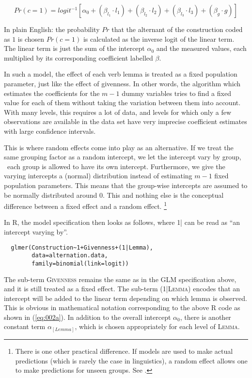 \begin{equation}
  Pr(c=1)=logit^{-1}\left[\alpha_0+(\beta_{l_1}\cdot l_1)+(\beta_{l_2}\cdot l_2)+(\beta_{l_3}\cdot l_3)+(\beta_{g}\cdot g)\right]
  \label{eq:001a}
\end{equation}

In plain English: the probability $Pr$ that the alternant of the construction coded as $1$ is chosen $Pr(c=1)$ is calculated as the inverse logit of the linear term.
The linear term is just the sum of the intercept $\alpha_0$ and the measured values, each multiplied by its corresponding coefficient labelled $\beta$.

In such a model, the effect of each verb lemma is treated as a fixed population parameter, just like the effect of givenness.
In other words, the algorithm which estimates the coefficients for the $m-1$ dummy variables tries to find a fixed value for each of them without taking the variation between them into account.
With many levels, this requires a lot of data, and levels for which only a few observations are available in the data set have very imprecise coefficient estimates with large confidence intervals.

This is where random effects come into play as an alternative.
If we treat the same grouping factor as a random intercept, we let the intercept vary by group, \ie\ each group is allowed to have its own intercept.
Furthermore, we give the varying intercepts a (normal) distribution instead of estimating $m-1$ fixed population parameters.
This means that the group-wise intercepts are assumed to be normally distributed around $0$.
This and nothing else is the conceptual difference between a fixed effect and a random effect.%
\footnote{There is one other practical difference.
If models are used to make actual predictions (which is rarely the case in linguistics), a random effect allows one to make predictions for unseen groups.
See \citet[272--275]{GelmanHill2006}.}

In R, the model specification then looks as follows, where \textsc{1|} can be read as ``an intercept varying by''.

\begin{lstlisting}
  glmer(Construction~1+Givenness+(1|Lemma),
        data=alternation.data,
        family=binomial(link=logit))
\end{lstlisting}

The sub-term \textsc{Givenness} remains the same as in the GLM specification above, and it is still treated as a fixed effect.
The sub-term \textsc{(1|Lemma)} encodes that an intercept will be added to the linear term depending on which lemma is observed.
This is obvious in mathematical notation corresponding to the above R code as shown in (\ref{eq:002a}).
In addition to the overall intercept $\alpha_0$, there is another constant term $\alpha_{[Lemma]}$, which is chosen appropriately for each level of \textsc{Lemma}.


